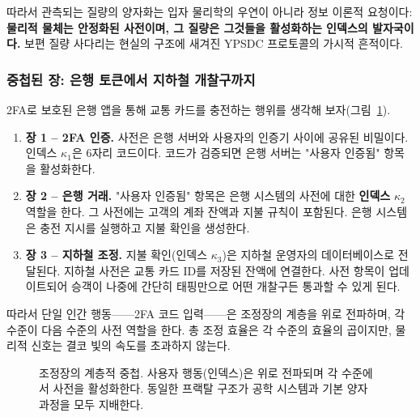 \documentclass[12pt,a4paper]{article}
\begin{document}
	따라서 관측되는 질량의 양자화는 입자 물리학의 우연이 아니라 정보 이론적 요청이다: \textbf{물리적 물체는 안정화된 사전이며, 그 질량은 그것들을 활성화하는 인덱스의 발자국이다.} 보편 질량 사다리는 현실의 구조에 새겨진 YPSDC 프로토콜의 가시적 흔적이다.
	
	\subsubsection{중첩된 장: 은행 토큰에서 지하철 개찰구까지}
	
	2FA로 보호된 은행 앱을 통해 교통 카드를 충전하는 행위를 생각해 보자(그림~\ref{fig:hierarchy}).
	
	\begin{enumerate}[leftmargin=*]
		\item \textbf{장 1 -- 2FA 인증.}
		사전은 은행 서버와 사용자의 인증기 사이에 공유된 비밀이다. 인덱스 $\kappa_1$은 6자리 코드이다. 코드가 검증되면 은행 서버는 "사용자 인증됨" 항목을 활성화한다.
		
		\item \textbf{장 2 -- 은행 거래.}
		"사용자 인증됨" 항목은 은행 시스템의 사전에 대한 \textbf{인덱스} $\kappa_2$ 역할을 한다. 그 사전에는 고객의 계좌 잔액과 지불 규칙이 포함된다. 은행 시스템은 충전 지시를 실행하고 지불 확인을 생성한다.
		
		\item \textbf{장 3 -- 지하철 조정.}
		지불 확인(인덱스 $\kappa_3$)은 지하철 운영자의 데이터베이스로 전달된다. 지하철 사전은 교통 카드 ID를 저장된 잔액에 연결한다. 사전 항목이 업데이트되어 승객이 나중에 간단히 태핑만으로 어떤 개찰구든 통과할 수 있게 된다.
	\end{enumerate}
	
	따라서 단일 인간 행동——2FA 코드 입력——은 조정장의 계층을 위로 전파하며, 각 수준이 다음 수준의 사전 역할을 한다. 총 조정 효율은 각 수준의 효율의 곱이지만, 물리적 신호는 결코 빛의 속도를 초과하지 않는다.
	
	\begin{figure}[htbp]
		\centering
		\caption{조정장의 계층적 중첩. 사용자 행동(인덱스)은 위로 전파되며 각 수준에서 사전을 활성화한다. 동일한 프랙탈 구조가 공학 시스템과 기본 양자 과정을 모두 지배한다.}
		\label{fig:hierarchy}
	\end{figure}
	
\end{document}
